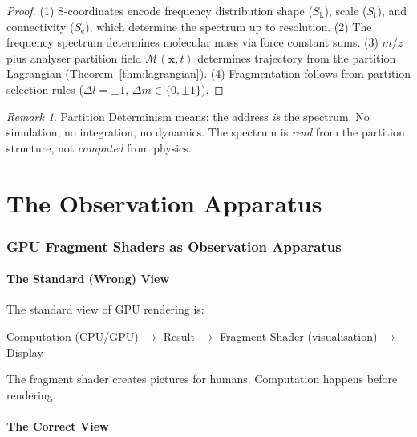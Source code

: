 \documentclass[11pt,twocolumn,a4paper]{article}
\theoremstyle{definition}
\theoremstyle{remark}
\newtheorem{remark}[theorem]{Remark}
\newcommand{\Sk}{S_{\mathrm{k}}}
\newcommand{\St}{S_{\mathrm{t}}}
\newcommand{\Se}{S_{\mathrm{e}}}
\newcommand{\Depth}{\mathcal{M}}
\begin{document}
\begin{proof}
(1) S-coordinates encode frequency distribution shape ($\Sk$), scale ($\St$), and connectivity ($\Se$), which determine the spectrum up to resolution. (2) The frequency spectrum determines molecular mass via force constant sums. (3) $m/z$ plus analyser partition field $\Depth(\mathbf{x},t)$ determines trajectory from the partition Lagrangian (Theorem~\ref{thm:lagrangian}). (4) Fragmentation follows from partition selection rules ($\Delta l = \pm 1$, $\Delta m \in \{0, \pm 1\}$).
\end{proof}

\begin{remark}
Partition Determinism means: the address \emph{is} the spectrum. No simulation, no integration, no dynamics. The spectrum is \emph{read} from the partition structure, not \emph{computed} from physics.
\end{remark}


\part{The Observation Apparatus}

\section{GPU Fragment Shaders as Observation Apparatus}
\label{sec:apparatus}

\subsection{The Standard (Wrong) View}

The standard view of GPU rendering is:
\begin{center}
Computation (CPU/GPU) $\to$ Result $\to$ Fragment Shader (visualisation) $\to$ Display
\end{center}
The fragment shader creates pictures for humans. Computation happens before rendering.

\subsection{The Correct View}
\end{document}
